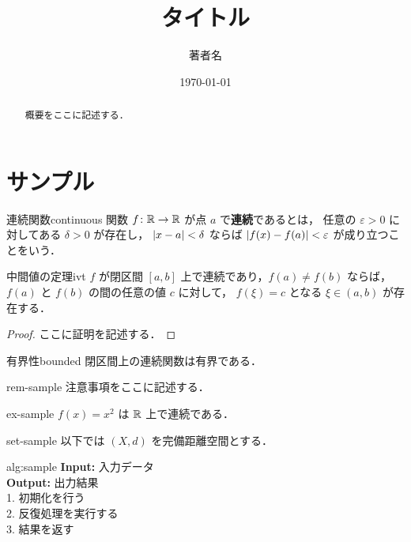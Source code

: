 \documentclass[uplatex, dvipdfmx]{jsreport}
\title{タイトル}
\author{著者名}
\date{\today}
\begin{document}
\maketitle

\begin{abstract}
概要をここに記述する．
\end{abstract}

\tableofcontents

% 

\chapter{サンプル}

\begin{definition}{連続関数}{continuous}
  関数 $f \colon \mathbb{R} \to \mathbb{R}$ が点 $a$ で\textbf{連続}であるとは，
  任意の $\varepsilon > 0$ に対してある $\delta > 0$ が存在し，
  $\lvert x - a \rvert < \delta$ ならば $\lvert f(x) - f(a) \rvert < \varepsilon$
  が成り立つことをいう．
\end{definition}

\begin{theorem}{中間値の定理}{ivt}
  $f$ が閉区間 $[a,b]$ 上で連続であり，$f(a) \neq f(b)$ ならば，
  $f(a)$ と $f(b)$ の間の任意の値 $c$ に対して，
  $f(\xi) = c$ となる $\xi \in (a,b)$ が存在する．
\end{theorem}

\begin{proof}
  ここに証明を記述する．
\end{proof}

\begin{proposition}{有界性}{bounded}
  閉区間上の連続関数は有界である．
\end{proposition}

\begin{remark}{}{rem-sample}
  注意事項をここに記述する．
\end{remark}

\begin{example}{}{ex-sample}
  $f(x) = x^2$ は $\mathbb{R}$ 上で連続である．
\end{example}

\begin{setting}{}{set-sample}
  以下では $(X, d)$ を完備距離空間とする．
\end{setting}

\begin{algorithm}{alg:sample}
  \textbf{Input:} 入力データ \\
  \textbf{Output:} 出力結果 \\[4pt]
  1. 初期化を行う \\
  2. 反復処理を実行する \\
  3. 結果を返す
\end{algorithm}

% 
% 
\end{document}
